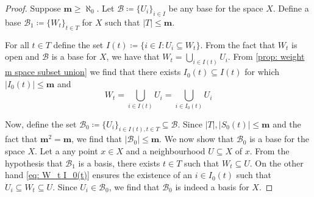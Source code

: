 \begin{proof}
Suppose \(\mathbf m \geq \aleph_0\). Let \(\mathcal B \coloneq \{U_i\}_{i \in I}\)
be any base for the space \(X\). Define a base \(\mathcal B_1 \coloneq \{W_t\}_{t
\in T}\) for \(X\) such that \(|T| \leq \mathbf m\).

For all \(t \in T\) define the set \(I(t) \coloneq \{i \in I \colon U_i \subseteq
W_t\}\). From the fact that \(W_t\) is open and \(\mathcal B\) is a base for
\(X\), we have that \(W_t = \bigcup_{i \in  I(t)} U_i\).  From \cref{prop:
weight m space subset union} we find that there exists \(I_0(t) \subseteq
I(t)\) for which \(|I_0(t)| \leq \mathbf m\) and
\begin{equation}\label{eq: W_t I_0(t)}
  W_t = \bigcup_{i \in  I(t)} U_i = \bigcup_{i \in  I_0(t)} U_i
\end{equation}

Now, define the set \(\mathcal B_0 \coloneq \{U_i\}_{i \in I(t), t \in T} \subseteq
\mathcal B\). Since \(|T|, |S_0(t)| \leq \mathbf m\) and the fact that
\(\mathbf m^2 = \mathbf m\), we find that \(|\mathcal B_0| \leq \mathbf m\).
We now show that \(\mathcal B_0\) is a base for the space \(X\). Let a any
point \(x \in X\) and a neighbourhood \(U \subseteq X\) of \(x\). From the
hypothesis that \(\mathcal B_1\) is a basis, there exists \(t \in T\) such
that \(W_t \subseteq U\). On the other hand \cref{eq: W_t I_0(t)} ensures the
existence of an \(i \in I_0(t)\) such that \(U_i \subseteq W_t \subseteq U\).
Since \(U_i \in \mathcal B_0\), we find that \(\mathcal B_0\) is indeed a
basis for \(X\).
\end{proof}
